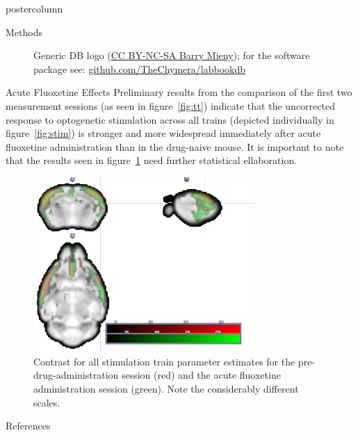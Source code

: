 \documentclass{beamer}
\begin{document}
\begin{frame}
\begin{columns}
\begin{column}{.57\textwidth}
\begin{beamercolorbox}[center]{postercolumn}
\begin{minipage}{.98\textwidth}
{\begin{myblock}{Methods}
\begin{figure}
\begin{minipage}{0.45\textwidth}
								\caption{Generic DB logo
									(\href{https://creativecommons.org/licenses/by-nc-sa/3.0/}{CC BY-NC-SA Barry Mieny});
									for the software package see:
									\href{https://github.com/TheChymera/labbookdb}{github.com/TheChymera/labbookdb}}
							\end{minipage}
						\end{figure}
					\end{myblock}\vfill
					\begin{myblock}{Acute Fluoxetine Effects}
						Preliminary results from the comparison of the first two
						measurement sessions (as seen in figure~\ref{fig:tt}) indicate
						that the uncorrected response to optogenetic stimulation across
						all trains (depicted individually in figure~\ref{fig:stim}) is
						stronger and more widespread immediately after acute fluoxetine
						administration than in the drug-naive mouse.
						It is important to note that the results seen in
						figure~\ref{fig:fail} need further statistical ellaboration.
						\begin{figure}
							\begin{minipage}{0.85\textwidth}
								\centering\includegraphics[width=0.75\textwidth]{img/fail.png}
								\caption{Contrast for all stimulation train parameter estimates
								for the pre-drug-administration session (red) and the acute
								fluoxetine administration session (green).
								Note the considerably different scales.}
								\label{fig:fail}
							\end{minipage}
						\end{figure}
					\end{myblock}\vfill
					\begin{myblock}{References}
						\footnotesize
						
						
					\end{myblock}\vfill
		}\end{minipage}\end{beamercolorbox}
	\end{column}
\end{columns}
\end{frame}
\end{document}
